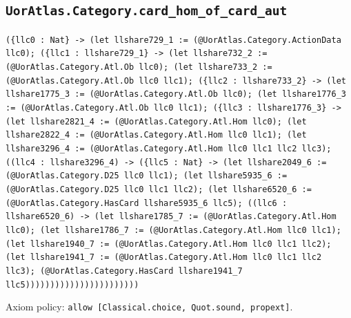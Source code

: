 \documentclass[11pt]{article}
\begin{document}
\subsection*{\texttt{UorAtlas.Category.card\_hom\_of\_card\_aut}}
\noindent\texttt{(\{llc0 : Nat\} -> (let llshare729\_1 := (@UorAtlas.Category.ActionData llc0); (\{llc1 : llshare729\_1\} -> (let llshare732\_2 := (@UorAtlas.Category.Atl.Ob llc0); (let llshare733\_2 := (@UorAtlas.Category.Atl.Ob llc0 llc1); (\{llc2 : llshare733\_2\} -> (let llshare1775\_3 := (@UorAtlas.Category.Atl.Ob llc0); (let llshare1776\_3 := (@UorAtlas.Category.Atl.Ob llc0 llc1); (\{llc3 : llshare1776\_3\} -> (let llshare2821\_4 := (@UorAtlas.Category.Atl.Hom llc0); (let llshare2822\_4 := (@UorAtlas.Category.Atl.Hom llc0 llc1); (let llshare3296\_4 := (@UorAtlas.Category.Atl.Hom llc0 llc1 llc2 llc3); ((llc4 : llshare3296\_4) -> (\{llc5 : Nat\} -> (let llshare2049\_6 := (@UorAtlas.Category.D25 llc0 llc1); (let llshare5935\_6 := (@UorAtlas.Category.D25 llc0 llc1 llc2); (let llshare6520\_6 := (@UorAtlas.Category.HasCard llshare5935\_6 llc5); ((llc6 : llshare6520\_6) -> (let llshare1785\_7 := (@UorAtlas.Category.Atl.Hom llc0); (let llshare1786\_7 := (@UorAtlas.Category.Atl.Hom llc0 llc1); (let llshare1940\_7 := (@UorAtlas.Category.Atl.Hom llc0 llc1 llc2); (let llshare1941\_7 := (@UorAtlas.Category.Atl.Hom llc0 llc1 llc2 llc3); (@UorAtlas.Category.HasCard llshare1941\_7 llc5)))))))))))))))))))))))}\par
\noindent Axiom policy: \texttt{allow [Classical.choice, Quot.sound, propext]}.\par
\end{document}

